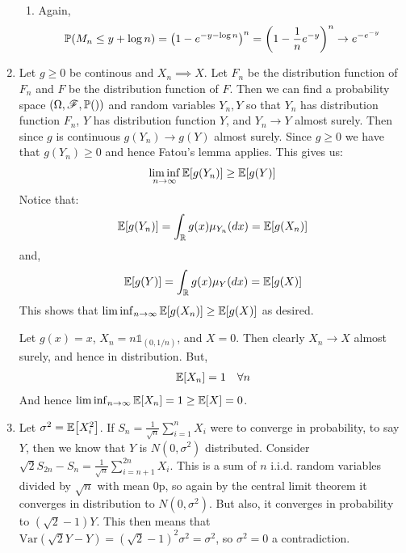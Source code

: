 \documentclass[12pt]{article}
\theoremstyle{definitionstyle}
\def\mbb#1{\mathbb{#1}}
\def\R{\mbb{R}}
\newcommand{\1}{\mathds 1}
\renewcommand{\P}{\mathbb P \qty}
\newcommand{\E}{\mathbb E \qty}
\newcommand{\Var}{\mathrm{Var}}
\begin{document}
\begin{enumerate}
\begin{enumerate}
            \item Again,
            \begin{align*}
                \P(M_n \leq y + \log n) = \qty(1-e^{-y - \log n})^n = \qty(1-\frac{1}{n}e^{-y})^n \to e^{-e^{-y}}
            \end{align*}
        \end{enumerate}

        \item Let $g \geq 0$ be continous and $X_n \implies X$. Let $F_n$ be the distribution function of $F_n$ and $F$ be the distribution function of $F$. Then we can find a probability space $(\Omega, \mathscr F, \P)$ and random variables $Y_n, Y$ so that $Y_n$ has distribution function $F_n$, $Y$ has distribution function $Y$, and $Y_n \to Y$ almost surely. Then since $g$ is continuous $g(Y_n) \to g(Y)$ almost surely. Since $g \geq 0$ we have that $g(Y_n) \geq 0$ and hence Fatou's lemma applies. This gives us:
        \begin{align*}
            \liminf_{n \to \infty} \E[g(Y_n)] \geq \E[g(Y)]
        \end{align*}
        Notice that:
        \begin{align*}
            \E[g(Y_n)] = \int_{\R} g(x) \mu_{Y_n}(dx) = \E[g(X_n)]
        \end{align*}
        and,
        \begin{align*}
            \E[g(Y)] = \int_{\R} g(x) \mu_Y(dx) = \E[g(X)]
        \end{align*}
        This shows that $\liminf_{n \to \infty} \E[g(X_n)] \geq \E[g(X)]$ as desired. 

        Let $g(x) = x$, $X_n = n\1_{(0, 1/n)}$, and $X = 0$. Then clearly $X_n \to X$ almost surely, and hence in distribution. But,
        \begin{align*}
            \E[X_n] = 1 \quad \forall n
        \end{align*}
        And hence $\liminf_{n \to \infty} \E[X_n] = 1 \geq \E[X] = 0$. 

        \item Let $\sigma^2 = \E[X_i^2]$. If $S_n = \frac{1}{\sqrt{n}} \sum_{i=1}^n X_i$ were to converge in probability, to say $Y$, then we know that $Y$ is $N(0,\sigma^2)$ distributed. Consider $\sqrt{2}S_{2n} - S_n = \frac{1}{\sqrt n}\sum_{i=n+1}^{2n} X_i$. This is a sum of $n$ i.i.d. random variables divided by $\sqrt{n}$ with mean $0$p, so again by the central limit theorem it converges in distribution to $N(0, \sigma^2)$. But also, it converges in probability to $(\sqrt{2} - 1)Y$. This then means that $\Var(\sqrt{2}Y - Y) = (\sqrt2 - 1)^2 \sigma^2 = \sigma^2$, so $\sigma^2 = 0$ a contradiction. 


\end{enumerate}
\end{document}
